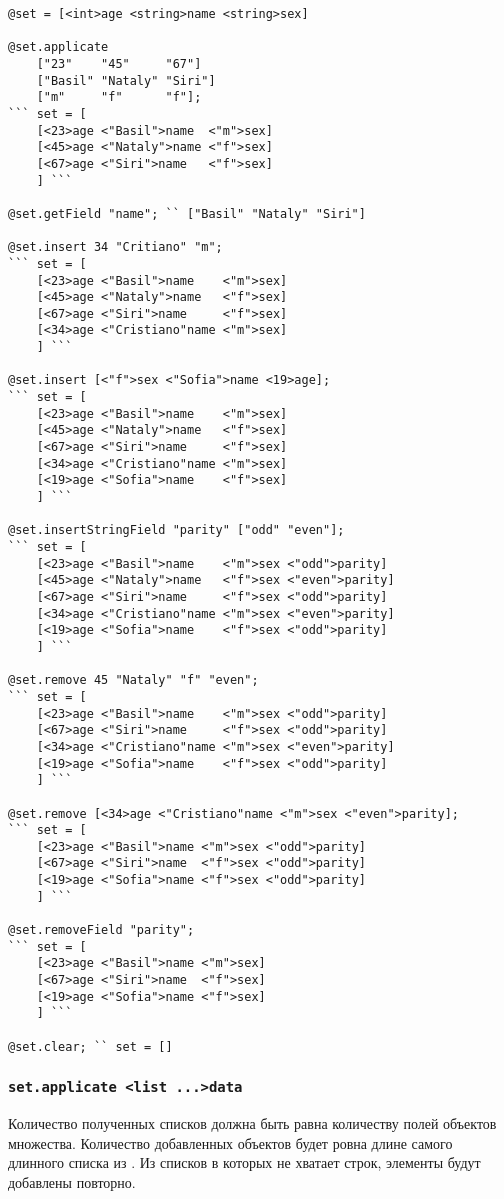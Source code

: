 \documentclass[a4paper, 14pt]{extarticle}
\begin{document}
\begin{lstlisting}[caption=Методы класса set, label=setmethods]
@set = [<int>age <string>name <string>sex]

@set.applicate 
	["23"    "45"     "67"]
	["Basil" "Nataly" "Siri"]
	["m"     "f"      "f"];
``` set = [
	[<23>age <"Basil">name  <"m">sex]
	[<45>age <"Nataly">name <"f">sex]
	[<67>age <"Siri">name   <"f">sex]
	] ```

@set.getField "name"; `` ["Basil" "Nataly" "Siri"]

@set.insert 34 "Critiano" "m";
``` set = [
	[<23>age <"Basil">name    <"m">sex]
	[<45>age <"Nataly">name   <"f">sex]
	[<67>age <"Siri">name     <"f">sex]
	[<34>age <"Cristiano"name <"m">sex]
	] ```

@set.insert [<"f">sex <"Sofia">name <19>age];
``` set = [
	[<23>age <"Basil">name    <"m">sex]
	[<45>age <"Nataly">name   <"f">sex]
	[<67>age <"Siri">name     <"f">sex]
	[<34>age <"Cristiano"name <"m">sex]
	[<19>age <"Sofia">name    <"f">sex]
	] ```

@set.insertStringField "parity" ["odd" "even"];
``` set = [
	[<23>age <"Basil">name    <"m">sex <"odd">parity]
	[<45>age <"Nataly">name   <"f">sex <"even">parity]
	[<67>age <"Siri">name     <"f">sex <"odd">parity]
	[<34>age <"Cristiano"name <"m">sex <"even">parity]
	[<19>age <"Sofia">name    <"f">sex <"odd">parity]
	] ```

@set.remove 45 "Nataly" "f" "even";
``` set = [
	[<23>age <"Basil">name    <"m">sex <"odd">parity]
	[<67>age <"Siri">name     <"f">sex <"odd">parity]
	[<34>age <"Cristiano"name <"m">sex <"even">parity]
	[<19>age <"Sofia">name    <"f">sex <"odd">parity]
	] ```

@set.remove [<34>age <"Cristiano"name <"m">sex <"even">parity];
``` set = [
	[<23>age <"Basil">name <"m">sex <"odd">parity]
	[<67>age <"Siri">name  <"f">sex <"odd">parity]
	[<19>age <"Sofia">name <"f">sex <"odd">parity]
	] ```

@set.removeField "parity";
``` set = [
	[<23>age <"Basil">name <"m">sex]
	[<67>age <"Siri">name  <"f">sex]
	[<19>age <"Sofia">name <"f">sex]
	] ```

@set.clear; `` set = []
\end{lstlisting}

\subsubsection{\lstinline|set.applicate <list ...>data|}

Количество полученных списков должна быть равна количеству полей объектов множества. Количество добавленных объектов будет ровна длине самого длинного списка из . Из списков в которых не хватает строк, элементы будут добавлены повторно.
\end{document}
